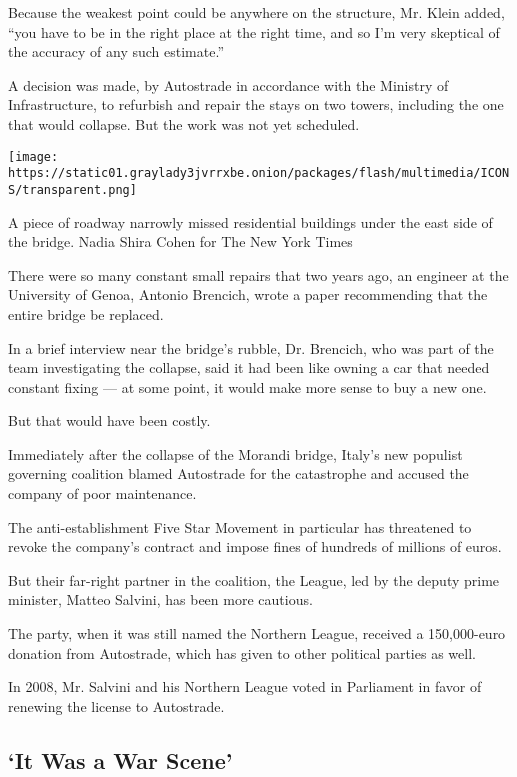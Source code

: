 Because the weakest point could be anywhere on the structure, Mr. Klein
added, ``you have to be in the right place at the right time, and so I'm
very skeptical of the accuracy of any such estimate.''

A decision was made, by Autostrade in accordance with the Ministry of
Infrastructure, to refurbish and repair the stays on two towers,
including the one that would collapse. But the work was not yet
scheduled.

\texttt{[image: https://static01.graylady3jvrrxbe.onion/packages/flash/multimedia/ICONS/transparent.png]}

A piece of roadway narrowly missed residential buildings under the east
side of the bridge. Nadia Shira Cohen for The New York Times

There were so many constant small repairs that two years ago, an
engineer at the University of Genoa, Antonio Brencich, wrote a paper
recommending that the entire bridge be replaced.

In a brief interview near the bridge's rubble, Dr. Brencich, who was
part of the team investigating the collapse, said it had been like
owning a car that needed constant fixing --- at some point, it would
make more sense to buy a new one.

But that would have been costly.

Immediately after the collapse of the Morandi bridge, Italy's new
populist governing coalition blamed Autostrade for the catastrophe and
accused the company of poor maintenance.

The anti-establishment Five Star Movement in particular has threatened
to revoke the company's contract and impose fines of hundreds of
millions of euros.

But their far-right partner in the coalition, the League, led by the
deputy prime minister, Matteo Salvini, has been more cautious.

The party, when it was still named the Northern League, received a
150,000-euro donation from Autostrade, which has given to other
political parties as well.

In 2008, Mr. Salvini and his Northern League voted in Parliament in
favor of renewing the license to Autostrade.

\hypertarget{it-was-a-war-scene}{%
\subsection{`It Was a War Scene'}\label{it-was-a-war-scene}}


